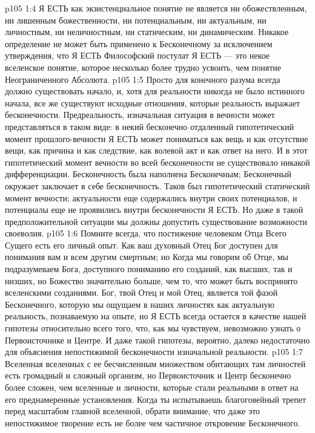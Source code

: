 \vs p105 1:4 Я ЕСТЬ как экзистенциальное понятие не является ни обожествленным, ни лишенным божественности, ни потенциальным, ни актуальным, ни личностным, ни неличностным, ни статическим, ни динамическим. Никакое определение не может быть применено к Бесконечному за исключением утверждения, что Я ЕСТЬ  Философский постулат Я ЕСТЬ --- это некое вселенское понятие, которое несколько более трудно усвоить, чем понятие Неограниченного Абсолюта.
\vs p105 1:5 Просто для конечного разума всегда должно существовать начало, и, хотя для реальности никогда не было истинного начала, все же существуют исходные отношения, которые реальность выражает бесконечности. Предреальность, изначальная ситуация в вечности может представляться в таком виде: в некий бесконечно отдаленный гипотетический момент прошлого\hyp{}вечности Я ЕСТЬ может пониматься как вещь и как отсутствие вещи, как причина и как следствие, как волевой акт и как ответ на него. И в этот гипотетический момент вечности во всей бесконечности не существовало никакой дифференциации. Бесконечность была наполнена Бесконечным; Бесконечный окружает заключает в себе бесконечность. Таков был гипотетический статический момент вечности; актуальности еще содержались внутри своих потенциалов, и потенциалы еще не проявились внутри бесконечности Я ЕСТЬ. Но даже в такой предположительной ситуации мы должны допустить существование возможности своеволия.
\vs p105 1:6 \pc Помните всегда, что постижение человеком Отца Всего Сущего есть его личный опыт. Как ваш духовный Отец Бог доступен для понимания вам и всем другим смертным; но  Когда мы говорим об Отце, мы подразумеваем Бога, доступного пониманию его созданий, как высших, так и низших, но Божество значительно больше, чем то, что может быть воспринято вселенскими созданиями. Бог, твой Отец и мой Отец, является той фазой Бесконечного, которую мы ощущаем в наших личностях как актуальную реальность, познаваемую на опыте, но Я ЕСТЬ всегда остается в качестве нашей гипотезы относительно всего того, что, как мы чувствуем, невозможно узнать о Первоисточнике и Центре. И даже такой гипотезы, вероятно, далеко недостаточно для объяснения непостижимой бесконечности изначальной реальности.
\vs p105 1:7 Вселенная вселенных с ее бесчисленным множеством обитающих там личностей есть громадный и сложный организм, но Первоисточник и Центр бесконечно более сложен, чем вселенные и личности, которые стали реальными в ответ на его преднамеренные установления. Когда ты испытываешь благоговейный трепет перед масштабом главной вселенной, обрати внимание, что даже это непостижимое творение есть не более чем частичное откровение Бесконечного.
